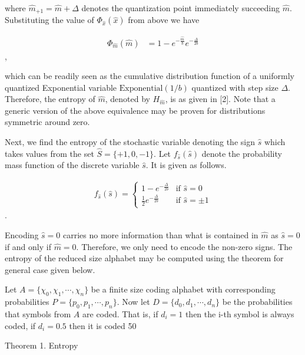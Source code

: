 where $\hat{m}_{+1} = \hat{m} + \Delta$ denotes the quantization point immediately succeeding $\hat{m}$. Substituting the value of $\Phi_{\hat{x}}(\hat{x})$ from above we have

\begin{align}\Phi_{\hat{m}}(\hat{m}) &= 1 - e^{-\frac{\hat{m}}{b}} e^{-\frac{\Delta}{2b}}\end{align},

which can be readily seen as the cumulative distribution function of a uniformly quantized Exponential variable $\text{Exponential}(1/b)$ quantized with step size $\Delta$. Therefore, the entropy of $\hat{m}$, denoted by $H_{\hat{m}}$, is as given in [2]. Note that a generic version of the above equivalence may be proven for distributions symmetric around zero.

Next, we find the entropy of the stochastic variable denoting the sign $\hat{s}$ which takes values from the set $\hat{S} = \{+1, 0, -1\}$. Let $f_{\hat{s}}(\hat{s})$ denote the probability mass function of the discrete variable $\hat{s}$. It is given as follows.

\begin{align}f_{\hat{s}}(\hat{s}) = \begin{cases}1 - e^{-\frac{\Delta}{2b}} & \text{if $\hat{s} = 0$}\\ \frac{1}{2} e^{-\frac{\Delta}{2b}} & \text{if $\hat{s} = \pm 1$}\end{cases}\end{align}.

Encoding $\hat{s} = 0$ carries no more information than what is contained in $\hat{m}$ as $\hat{s} = 0$ if and only if $\hat{m} = 0$. Therefore, we only need to encode the non-zero signs. The entropy of the reduced size alphabet may be computed using the theorem for general case given below.

Let $A = \{\chi_0, \chi_1, \cdots, \chi_n\}$ be a finite size coding alphabet with corresponding probabilities $P = \{p_0, p_1, \cdots, p_n\}$. Now let $D = \{d_0, d_1, \cdots, d_n\}$ be the probabilities that symbols from $A$ are coded. That is, if $d_i = 1$ then the i-th symbol is always coded, if $d_i = 0.5$ then it is coded 50%

Theorem 1. Entropy

